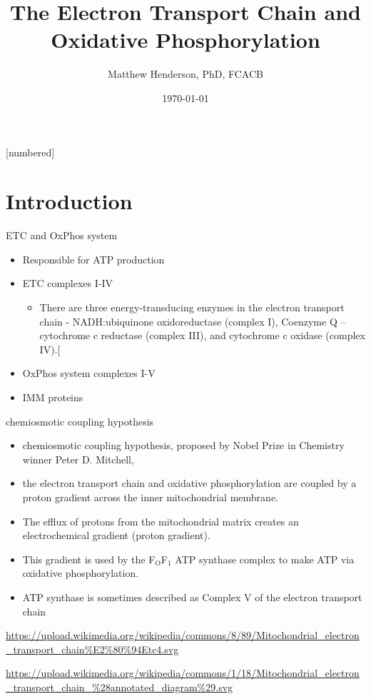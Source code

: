 \documentclass[presentation, smaller]{beamer}
\author{Matthew Henderson, PhD, FCACB}
\date{\today}
\title{The Electron Transport Chain and Oxidative Phosphorylation}
\institute[NSO]{Newborn Screening Ontario | The University of Ottawa}
\begin{document}
\maketitle


\vspace{220pt}
\beamertemplatenavigationsymbolsempty
{}[numbered]

\section{Introduction}
\label{sec:org515b393}
\begin{frame}[label={sec:org4ae430d}]{ETC and OxPhos system}
\begin{itemize}
\item Responsible for ATP production
\item ETC complexes I-IV
\begin{itemize}
\item There are three energy-transducing enzymes in the electron transport chain - NADH:ubiquinone oxidoreductase (complex I), Coenzyme Q – cytochrome c reductase (complex III), and cytochrome c oxidase (complex IV).[
\end{itemize}
\item OxPhos system complexes I-V
\item IMM proteins
\end{itemize}
\begin{block}{chemiosmotic coupling hypothesis}
\begin{itemize}
\item chemiosmotic coupling hypothesis, proposed by Nobel Prize in Chemistry winner Peter D. Mitchell,
\item the electron transport chain and oxidative phosphorylation are coupled by a proton gradient across the inner mitochondrial membrane.
\item The efflux of protons from the mitochondrial matrix creates an electrochemical gradient (proton gradient).
\item This gradient is used by the F\(_{\text{O}}\)F\(_{\text{1}}\) ATP synthase complex to make ATP via oxidative phosphorylation.
\item ATP synthase is sometimes described as Complex V of the electron transport chain
\end{itemize}

\url{https://upload.wikimedia.org/wikipedia/commons/8/89/Mitochondrial\_electron\_transport\_chain\%E2\%80\%94Etc4.svg}

\url{https://upload.wikimedia.org/wikipedia/commons/1/18/Mitochondrial\_electron\_transport\_chain\_\%28annotated\_diagram\%29.svg}
\end{block}
\end{frame}
\end{document}
